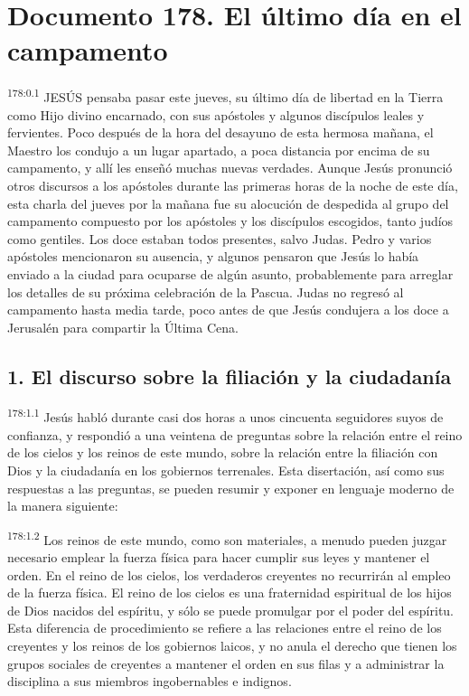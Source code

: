 \chapter{Documento 178. El último día en el campamento}
\par
\textsuperscript{178:0.1} JESÚS pensaba pasar este jueves, su último día de libertad en la Tierra como Hijo divino encarnado, con sus apóstoles y algunos discípulos leales y fervientes. Poco después de la hora del desayuno de esta hermosa mañana, el Maestro los condujo a un lugar apartado, a poca distancia por encima de su campamento, y allí les enseñó muchas nuevas verdades. Aunque Jesús pronunció otros discursos a los apóstoles durante las primeras horas de la noche de este día, esta charla del jueves por la mañana fue su alocución de despedida al grupo del campamento compuesto por los apóstoles y los discípulos escogidos, tanto judíos como gentiles. Los doce estaban todos presentes, salvo Judas. Pedro y varios apóstoles mencionaron su ausencia, y algunos pensaron que Jesús lo había enviado a la ciudad para ocuparse de algún asunto, probablemente para arreglar los detalles de su próxima celebración de la Pascua. Judas no regresó al campamento hasta media tarde, poco antes de que Jesús condujera a los doce a Jerusalén para compartir la Última Cena.

\section*{1. El discurso sobre la filiación y la ciudadanía}
\par
\textsuperscript{178:1.1} Jesús habló durante casi dos horas a unos cincuenta seguidores suyos de confianza, y respondió a una veintena de preguntas sobre la relación entre el reino de los cielos y los reinos de este mundo, sobre la relación entre la filiación con Dios y la ciudadanía en los gobiernos terrenales. Esta disertación, así como sus respuestas a las preguntas, se pueden resumir y exponer en lenguaje moderno de la manera siguiente:

\par
\textsuperscript{178:1.2} Los reinos de este mundo, como son materiales, a menudo pueden juzgar necesario emplear la fuerza física para hacer cumplir sus leyes y mantener el orden. En el reino de los cielos, los verdaderos creyentes no recurrirán al empleo de la fuerza física. El reino de los cielos es una fraternidad espiritual de los hijos de Dios nacidos del espíritu, y sólo se puede promulgar por el poder del espíritu. Esta diferencia de procedimiento se refiere a las relaciones entre el reino de los creyentes y los reinos de los gobiernos laicos, y no anula el derecho que tienen los grupos sociales de creyentes a mantener el orden en sus filas y a administrar la disciplina a sus miembros ingobernables e indignos.

